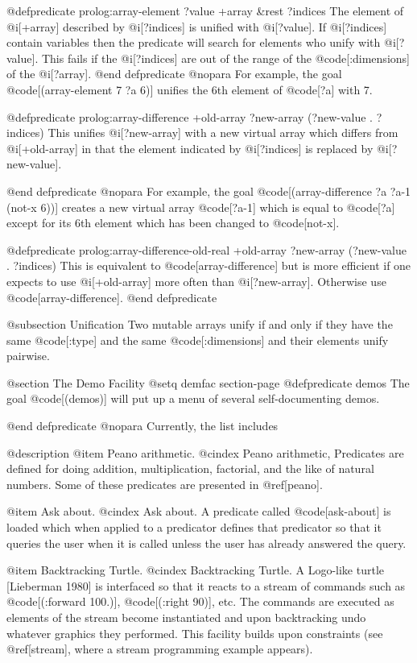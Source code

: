 {@defpredicate prolog:array-element ?value +array &rest ?indices
The element of @i[+array] described by @i[?indices] is unified with
@i[?value].
If @i[?indices] contain variables then the predicate will search for
elements who unify with @i[?value].
This fails if the @i[?indices] are out of the range of the
@code[:dimensions] of the @i[?array].
@end defpredicate
@nopara
For example, the goal @code[(array-element 7 ?a 6)]
unifies the 6th element of @code[?a] with 7.

@defpredicate prolog:array-difference +old-array ?new-array (?new-value . ?indices)
This unifies @i[?new-array] with a new virtual array
which differs from @i[+old-array]
in that the element indicated by @i[?indices] is replaced by
@i[?new-value].

@end defpredicate
@nopara
For example, the goal @code[(array-difference ?a ?a-1 (not-x 6))]
creates a new virtual array @code[?a-1] which is equal to @code[?a] except
for its 6th element which has been changed to @code[not-x].

@defpredicate prolog:array-difference-old-real +old-array ?new-array (?new-value . ?indices)
This is equivalent to @code[array-difference]
but is more efficient if one expects to use @i[+old-array] more often than
@i[?new-array]. Otherwise use @code[array-difference].
@end defpredicate

@subsection Unification
Two mutable arrays unify if and only if they have the same @code[:type]
and the same @code[:dimensions] and their elements unify pairwise.

@section The Demo Facility
@setq demfac section-page
@defpredicate demos
The goal @code[(demos)] will put up a menu of several self-documenting
demos. 

@end defpredicate
@nopara
Currently, the list includes

@description
@item Peano arithmetic.
@cindex Peano arithmetic,
Predicates are defined for doing addition, 
multiplication, factorial, and the like of natural numbers.
Some of these predicates are presented in @ref[peano].

@item Ask about.
@cindex Ask about.
A predicate called @code[ask-about] is loaded which when 
applied to
a predicator defines that predicator so that it queries the user when it is
called unless the user has already answered the query.

@item Backtracking Turtle.
@cindex Backtracking Turtle.
A Logo-like turtle [Lieberman 1980]
is interfaced so that it reacts to a stream of commands
such as @code[(:forward 100.)], @code[(:right 90)], etc.
The commands are executed as elements of the stream become instantiated
and upon backtracking undo whatever graphics they performed.
This facility builds upon constraints (see @ref[stream], where a
stream programming example appears).

}
